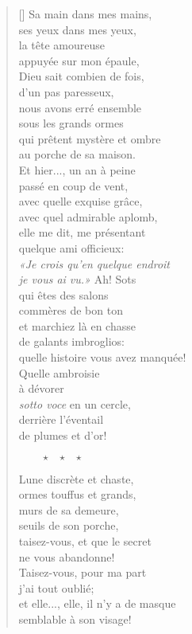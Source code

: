 \documentclass[a4paper,12pt]{book}
\begin{document}
\begin{verse}[\versewidth]
  Sa main dans mes mains, \\
  ses yeux dans mes yeux, \\
  la tête amoureuse \\
  appuyée sur mon épaule, \\
  Dieu sait combien de fois, \\
  d'un pas paresseux, \\
  nous avons erré ensemble \\
  sous les grands ormes \\
  qui prêtent mystère et ombre \\
  au porche de sa maison. \\
  Et hier..., un an à peine \\
  passé en coup de vent, \\
  avec quelle exquise grâce, \\
  avec quel admirable aplomb, \\
  elle me dit, me présentant  \\
  quelque ami officieux: \\
  \emph{«Je crois qu'en quelque endroit \\
    je vous ai vu.»} Ah! Sots \\
  qui êtes des salons \\
  commères de bon ton \\
  et marchiez là en chasse \\
  de galants imbroglios: \\
  quelle histoire vous avez manquée! \\
  Quelle ambroisie \\
  à dévorer \\
  \emph{sotto voce} en un cercle, \\
  derrière l'éventail \\
  de plumes et d'or!

  $\ \ \ \ \ \ \ \ \ \star \ \ \ \star \ \ \ \star$

  Lune discrète et chaste, \\
  ormes touffus et grands, \\
  murs de sa demeure, \\
  seuils de son porche, \\
  taisez-vous, et que le secret \\
  ne vous abandonne! \\
  Taisez-vous, pour ma part \\
  j'ai tout oublié; \\
  et elle..., elle, il n'y a de masque \\
  semblable à son visage!
\end{verse}
\end{document}
